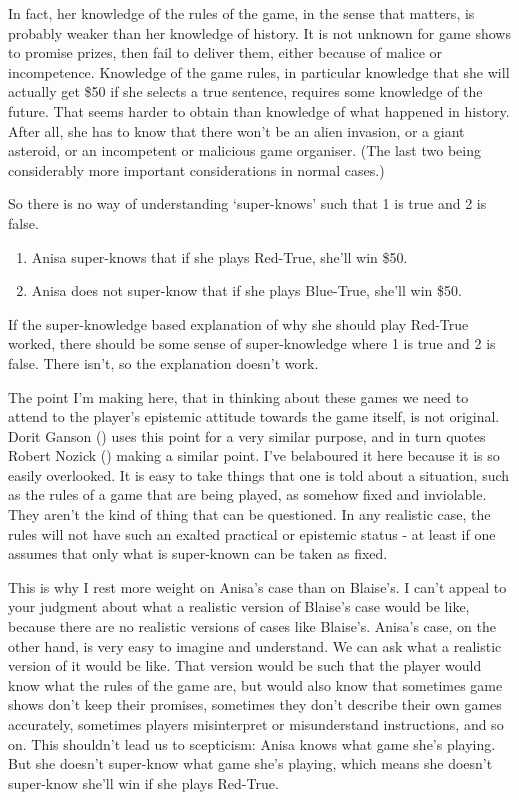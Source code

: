 \documentclass[
  10pt,
  letterpaper,
  twoside]{scrbook}
\providecommand{\tightlist}{%
  \setlength{\itemsep}{0pt}\setlength{\parskip}{0pt}}\usepackage{longtable,booktabs,array}
\begin{document}
In fact, her knowledge of the rules of the game, in the sense that
matters, is probably weaker than her knowledge of history. It is not
unknown for game shows to promise prizes, then fail to deliver them,
either because of malice or incompetence. Knowledge of the game rules,
in particular knowledge that she will actually get \$50 if she selects a
true sentence, requires some knowledge of the future. That seems harder
to obtain than knowledge of what happened in history. After all, she has
to know that there won't be an alien invasion, or a giant asteroid, or
an incompetent or malicious game organiser. (The last two being
considerably more important considerations in normal cases.)

So there is no way of understanding `super-knows' such that 1 is true
and 2 is false.

\begin{enumerate}
\def\labelenumi{\arabic{enumi}.}
\tightlist
\item
  Anisa super-knows that if she plays Red-True, she'll win \$50.
\item
  Anisa does not super-know that if she plays Blue-True, she'll win
  \$50.
\end{enumerate}

If the super-knowledge based explanation of why she should play Red-True
worked, there should be some sense of super-knowledge where 1 is true
and 2 is false. There isn't, so the explanation doesn't work.

The point I'm making here, that in thinking about these games we need to
attend to the player's epistemic attitude towards the game itself, is
not original. Dorit Ganson () uses this
point for a very similar purpose, and in turn quotes Robert Nozick
() making a similar point. I've
belaboured it here because it is so easily overlooked. It is easy to
take things that one is told about a situation, such as the rules of a
game that are being played, as somehow fixed and inviolable. They aren't
the kind of thing that can be questioned. In any realistic case, the
rules will not have such an exalted practical or epistemic status - at
least if one assumes that only what is super-known can be taken as
fixed.

This is why I rest more weight on Anisa's case than on Blaise's. I can't
appeal to your judgment about what a realistic version of Blaise's case
would be like, because there are no realistic versions of cases like
Blaise's. Anisa's case, on the other hand, is very easy to imagine and
understand. We can ask what a realistic version of it would be like.
That version would be such that the player would know what the rules of
the game are, but would also know that sometimes game shows don't keep
their promises, sometimes they don't describe their own games
accurately, sometimes players misinterpret or misunderstand
instructions, and so on. This shouldn't lead us to scepticism: Anisa
knows what game she's playing. But she doesn't super-know what game
she's playing, which means she doesn't super-know she'll win if she
plays Red-True.
\end{document}
